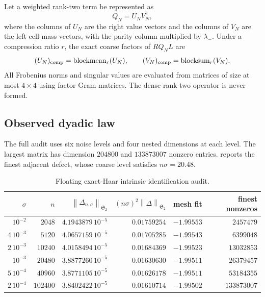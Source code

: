 \documentclass[11pt]{article}
\theoremstyle{definition}
\theoremstyle{remark}
\newcommand{\HS}{\mathfrak S_2}
\newcommand{\norm}[1]{\left\lVert #1\right\rVert}
\begin{document}
Let a weighted rank-two term be represented as
\begin{equation}
 Q_N=U_NV_N^{\mathsf T},
 \label{eq:factorization}
\end{equation}
where the columns of $U_N$ are the right value vectors and the columns of
$V_N$ are the left cell-mass vectors, with the parity column multiplied by
$\lambda_-$.  Under a compression ratio $r$, the exact coarse factors of
$RQ_NL$ are
\begin{equation}
 (U_N)_{\rm comp}=\operatorname{blockmean}_r(U_N),
 \qquad
 (V_N)_{\rm comp}=\operatorname{blocksum}_r(V_N).
 \label{eq:factor-compression}
\end{equation}
All Frobenius norms and singular values are evaluated from matrices of size
at most $4\times4$ using factor Gram matrices.  The dense rank-two operator
is never formed.

\subsection{Observed dyadic law}

The full audit uses six noise levels and four nested dimensions at each
level.  The largest matrix has dimension $204800$ and $133873007$ nonzero
entries.   reports the finest adjacent defect, whose
coarse level satisfies $n\sigma=20.48$.

\begin{table}[H]
\centering
\small
\caption{Floating exact-Haar intrinsic identification audit.}
\label{tab:dyadic-audit}
\begin{tabular}{@{}rrrrrr@{}}
\toprule
$\sigma$ & $n$ & $\norm{\Delta_{n,\sigma}}_{\HS}$
& $(n\sigma)^2\norm{\Delta}_{\HS}$
& mesh fit & finest nonzeros\\
\midrule
$10^{-2}$       & $2048$   & $4.1943879\,10^{-5}$ & $0.01759254$ & $-1.99553$ & $2457479$\\
$4\,10^{-3}$    & $5120$   & $4.0657159\,10^{-5}$ & $0.01705285$ & $-1.99543$ & $6399048$\\
$2\,10^{-3}$    & $10240$  & $4.0158494\,10^{-5}$ & $0.01684369$ & $-1.99523$ & $13032853$\\
$10^{-3}$       & $20480$  & $3.8877260\,10^{-5}$ & $0.01630630$ & $-1.99511$ & $26379457$\\
$5\,10^{-4}$    & $40960$  & $3.8771105\,10^{-5}$ & $0.01626178$ & $-1.99511$ & $53184355$\\
$2\,10^{-4}$    & $102400$ & $3.8402422\,10^{-5}$ & $0.01610714$ & $-1.99502$ & $133873007$\\
\bottomrule
\end{tabular}
\end{table}
\end{document}
